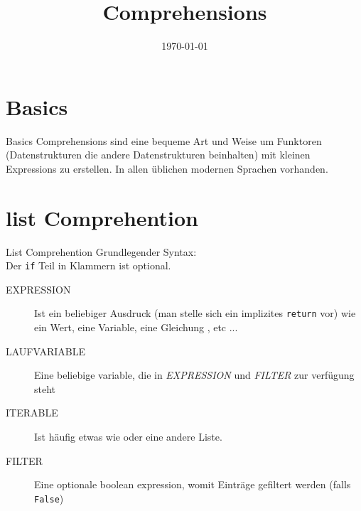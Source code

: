 


\newcommand{\topic}{
	Comprehensions
}

\title{\topic}
\supertitle{\course}
\date{\today}



\maketitle

\begin{frame}
	\tableofcontents
\end{frame}



\section{Basics}
\begin{frame}{Basics}
  Comprehensions sind eine bequeme Art und Weise um Funktoren (Datenstrukturen die andere Datenstrukturen beinhalten) mit kleinen Expressions zu erstellen.
  In allen üblichen modernen Sprachen vorhanden.
\end{frame}

\section{list Comprehention}
\begin{frame}{List Comprehention}
  Grundlegender Syntax: \\
  Der \texttt{if} Teil in Klammern ist optional.\\
  \begin{description}
    \item[EXPRESSION] Ist ein beliebiger Ausdruck (man stelle sich ein implizites \texttt{return} vor) wie ein Wert, eine Variable, eine Gleichung , etc ...
    \item[LAUFVARIABLE] Eine beliebige variable, die in \textit{EXPRESSION} und \textit{FILTER} zur verfügung steht
    \item[ITERABLE] Ist häufig etwas wie  oder eine andere Liste.
    \item[FILTER] Eine optionale boolean expression, womit Einträge gefiltert werden (falls \texttt{False})
  \end{description}


\end{frame}

